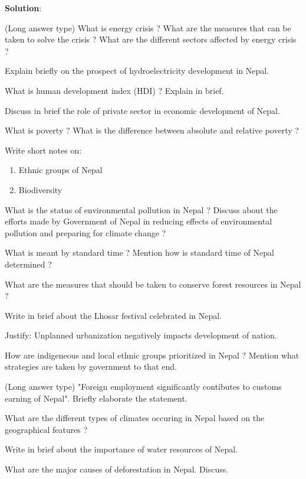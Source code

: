 \documentclass[
  openany]{book}
\newcommand{\question}{\item}
\newenvironment{solution}{ {\bfseries Solution}:}{}
\begin{document}
\begin{questions}
\begin{solution}
\end{solution}

\question (Long answer type) What is energy crisis ? What are the measures that can be taken to solve the crisis ? What are the different sectors affected by energy crisis ?

\question Explain briefly on the prospect of hydroelectricity development in Nepal.

\question What is human development index (HDI) ? Explain in brief.

\question Discuss in brief the role of private sector in economic development of Nepal. 

\question What is poverty ? What is the difference between absolute and relative poverty ?

\question Write short notes on:

\begin{enumerate}[label=(\roman*)]
\item Ethnic groups of Nepal
\item Biodiversity
\end{enumerate}

\question What is the status of environmental pollution in Nepal ? Discuss about the efforts made by Government of Nepal in reducing effects of environmental pollution and preparing for climate change ?

\question What is meant by standard time ? Mention how is standard time of Nepal determined ?

\question What are the measures that should be taken to conserve forest resources in Nepal ?

\question Write in brief about the Lhosar festival celebrated in Nepal.

\question Justify: Unplanned urbanization negatively impacts development of nation.

\question How are indigeneous and local ethnic groups prioritized in Nepal ? Mention what strategies are taken by government to that end.

\question (Long answer type) "Foreign employment significantly contibutes to customs earning of Nepal". Briefly elaborate the statement.

\question What are the different types of climates occuring in Nepal based on the geographical features ?

\question Write in brief about the importance of water resources of Nepal.

\question What are the major causes of deforestation in Nepal. Discuss.


\end{questions}
\end{document}
